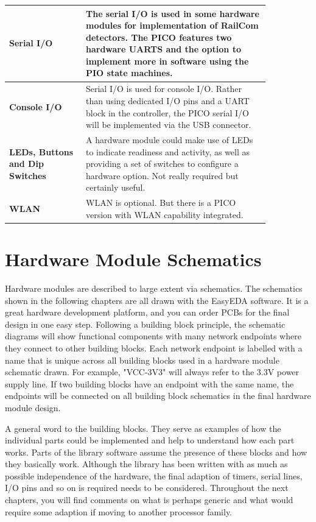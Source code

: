 \begin{longtable}{@{}p{0.25\linewidth}p{0.6\linewidth}@{}}
    \midrule
    \textbf{Serial I/O} & The serial I/O is used in some hardware modules for implementation of RailCom detectors. The PICO features two hardware UARTS and the option to implement more in software using the PIO state machines. \\
    \midrule
    \textbf{Console I/O} & Serial I/O is used for console I/O. Rather than using dedicated I/O pins and a UART block in the controller, the PICO serial I/O will be implemented via the USB connector. \\
    \textbf{LEDs, Buttons and Dip Switches} & A hardware module could make use of LEDs to indicate readiness and activity, as well as providing a set of switches to configure a hardware option. Not really required but certainly useful. \\
    \midrule
    \textbf{WLAN} & WLAN is optional. But there is a PICO version with WLAN capability integrated. \\
\end{longtable}

\section{Hardware Module Schematics}

Hardware modules are described to large extent via schematics. The schematics shown in the following chapters are all drawn with the EasyEDA software. It is a great hardware development platform, and you can order PCBs for the final design in one easy step. Following a building block principle, the schematic diagrams will show functional components with many network endpoints where they connect to other building blocks. Each network endpoint is labelled with a name that is unique across all building blocks used in a hardware module schematic drawn. For example, "VCC-3V3" will always refer to the 3.3V power supply line. If two building blocks have an endpoint with the same name, the endpoints will be connected on all building block schematics in the final hardware module design.

A general word to the building blocks. They serve as examples of how the individual parts could be implemented and help to understand how each part works. Parts of the library software assume the presence of these blocks and how they basically work. Although the library has been written with as much as possible independence of the hardware, the final adaption of timers, serial lines, I/O pins and so on is required needs to be considered. Throughout the next chapters, you will find comments on what is perhaps generic and what would require some adaption if moving to another processor family.

